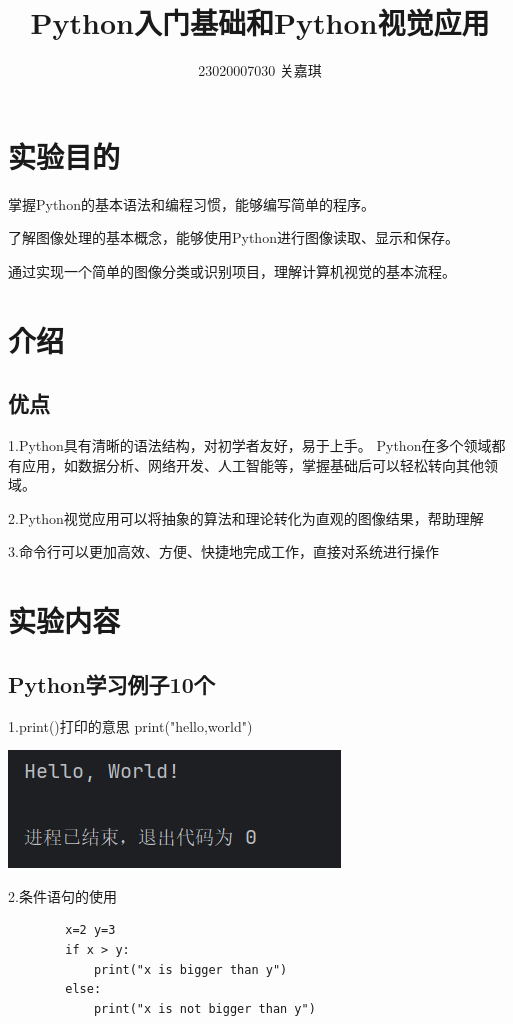 \documentclass{article}
\title{Python入门基础和Python视觉应用}
\author{23020007030  关嘉琪}
\begin{document}
	
	\maketitle
	
	\section{实验目的}
	掌握Python的基本语法和编程习惯，能够编写简单的程序。
	
	了解图像处理的基本概念，能够使用Python进行图像读取、显示和保存。
	
	通过实现一个简单的图像分类或识别项目，理解计算机视觉的基本流程。
	
	\section{介绍}
	\subsection{优点}
	1.Python具有清晰的语法结构，对初学者友好，易于上手。
	Python在多个领域都有应用，如数据分析、网络开发、人工智能等，掌握基础后可以轻松转向其他领域。
	
	2.Python视觉应用可以将抽象的算法和理论转化为直观的图像结果，帮助理解
	
	3.命令行可以更加高效、方便、快捷地完成工作，直接对系统进行操作
	\section{实验内容}
	\subsection{Python学习例子10个}
	
	1.print()打印的意思
	print("hello,world")
	
	\noindent
	\begin{minipage}{\linewidth}
		\centering
		\includegraphics[width=0.5\linewidth]{example1.png}
		\label{fig:example}
	\end{minipage}
	
	
	2.条件语句的使用
	\begin{verbatim}
		x=2 y=3
		if x > y:
			print("x is bigger than y")
		else:
			print("x is not bigger than y")
		
	\end{verbatim}
	
\end{document}
